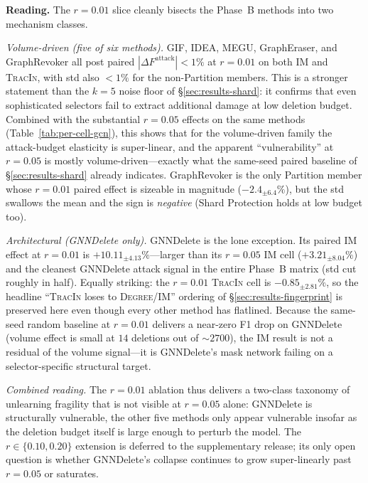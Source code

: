 \textbf{Reading.} The $r{=}0.01$ slice cleanly bisects the Phase~B
methods into two mechanism classes.

\textit{Volume-driven (five of six methods).} GIF, IDEA, MEGU,
GraphEraser, and GraphRevoker all post paired
$|\Delta F^{\mathrm{attack}}|<1\%$ at $r{=}0.01$ on both \textsc{IM}
and \textsc{TracIn}, with std also $<1\%$ for the non-Partition
members. This is a stronger statement than the $k{=}5$ noise floor
of \S\ref{sec:results-shard}: it confirms that even sophisticated
selectors fail to extract additional damage at low deletion budget.
Combined with the substantial $r{=}0.05$ effects on the same
methods (Table~\ref{tab:per-cell-gcn}), this shows that for the
volume-driven family the attack-budget elasticity is super-linear,
and the apparent ``vulnerability'' at $r{=}0.05$ is mostly
volume-driven---exactly what
the same-seed paired baseline of \S\ref{sec:results-shard} already
indicates. GraphRevoker is the only Partition member whose
$r{=}0.01$ paired effect is sizeable in magnitude
($-2.4_{\pm 6.4}\%$), but the std swallows the mean and the sign is
\emph{negative} (Shard Protection holds at low budget too).

\textit{Architectural (GNNDelete only).} GNNDelete is the lone
exception. Its paired \textsc{IM} effect at $r{=}0.01$ is
$+10.11_{\pm 4.13}\%$---larger than its $r{=}0.05$ \textsc{IM} cell
($+3.21_{\pm 8.04}\%$) and the cleanest GNNDelete attack signal in
the entire Phase~B matrix (std cut roughly in half). Equally
striking: the $r{=}0.01$ \textsc{TracIn} cell is
$-0.85_{\pm 2.81}\%$, so the headline ``\textsc{TracIn} loses to
\textsc{Degree}/\textsc{IM}'' ordering of \S\ref{sec:results-fingerprint}
is preserved here even though every other method has flatlined.
Because the same-seed random baseline at $r{=}0.01$ delivers a near-zero
F1 drop on GNNDelete (volume effect is small at $14$ deletions out
of $\sim 2700$), the IM result is not a residual of the volume
signal---it is GNNDelete's mask network failing on a
selector-specific structural target.

\textit{Combined reading.} The $r{=}0.01$ ablation thus delivers a
two-class taxonomy of unlearning fragility that is not visible at
$r{=}0.05$ alone: GNNDelete is structurally vulnerable, the other
five methods only appear vulnerable insofar as the deletion budget
itself is large enough to perturb the model. The
$r\in\{0.10,0.20\}$ extension is deferred to the supplementary
release; its only open question is whether GNNDelete's collapse
continues to grow super-linearly past $r{=}0.05$ or saturates.


